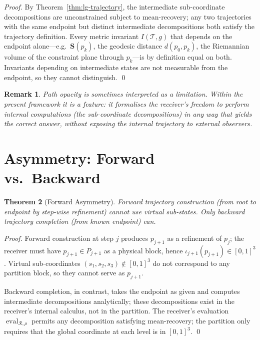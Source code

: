 \documentclass[twocolumn,a4paper]{article}
\newtheorem{theorem}{Theorem}[section]
\newtheorem{remark}[theorem]{Remark}
\DeclareMathOperator{\eval}{eval}
\newcommand{\receiver}{\mathcal{R}}
\newcommand{\Stuple}{\mathbf{S}}
\newcommand{\Trajec}{\mathcal{T}}
\begin{document}
\begin{proof}
By Theorem~\ref{thm:lg-trajectory}, the intermediate sub-coordinate decompositions are unconstrained subject to mean-recovery; any two trajectories with the same endpoint but distinct intermediate decompositions both satisfy the trajectory definition. Every metric invariant $I(\Trajec,g)$ that depends on the endpoint alone---e.g.\ $\Stuple(p_{k})$, the geodesic distance $d(p_{0},p_{k})$, the Riemannian volume of the constraint plane through $p_{k}$---is by definition equal on both. Invariants depending on intermediate states are not measurable from the endpoint, so they cannot distinguish. \qed
\end{proof}

\begin{remark}
Path opacity is sometimes interpreted as a limitation. Within the present framework it is a feature: it formalises the receiver's freedom to perform internal computations (the sub-coordinate decompositions) in any way that yields the correct answer, without exposing the internal trajectory to external observers.
\end{remark}

\section{Asymmetry: Forward vs.\ Backward}
\label{sec:asymmetry}

\begin{theorem}[Forward Asymmetry]
\label{thm:forward-asymmetry}
Forward trajectory construction (from root to endpoint by step-wise refinement) cannot use virtual sub-states. Only backward trajectory completion (from known endpoint) can.
\end{theorem}

\begin{proof}
Forward construction at step $j$ produces $p_{j+1}$ as a refinement of $p_{j}$; the receiver must have $p_{j+1}\in P_{j+1}$ as a physical block, hence $\iota_{j+1}(p_{j+1})\in[0,1]^{3}$. Virtual sub-coordinates $(s_{1},s_{2},s_{3})\notin[0,1]^{3}$ do not correspond to any partition block, so they cannot serve as $p_{j+1}$.

Backward completion, in contrast, takes the endpoint as given and computes intermediate decompositions analytically; these decompositions exist in the receiver's internal calculus, not in the partition. The receiver's evaluation $\eval_{\receiver,\rho}$ permits any decomposition satisfying mean-recovery; the partition only requires that the global coordinate at each level is in $[0,1]^{3}$. \qed
\end{proof}
\end{document}
